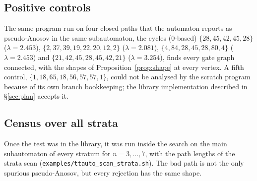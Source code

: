 \documentclass[12pt]{amsart}
\newcommand{\code}[1]{\texttt{#1}}
\newcommand{\lam}{\lambda}
\theoremstyle{plain}
\theoremstyle{definition}
\begin{document}
\subsection{Positive controls}
The same program run on four closed paths that the automaton reports as
pseudo-Anosov in the same subautomaton, the cycles (0-based)
$\{28,45,42,45,28\}$ ($\lam=2.453$), $\{2,37,39,19,22,20,12,2\}$
($\lam=2.081$), $\{4,84,28,45,28,80,4\}$ ($\lam=2.453$) and
$\{21,42,45,28,45,42,21\}$ ($\lam=3.254$), finds every gate graph
connected, with the shapes of Proposition~\ref{prop:shape} at every
vertex.  A fifth control, $\{1,18,65,18,56,57,57,1\}$, could not be
analysed by the scratch program because of its own branch bookkeeping; the
library implementation described in \S\ref{sec:plan} accepts it.

\subsection{Census over all strata}
\label{sec:census}
Once the test was in the library, it was run inside the search on the
main subautomaton of every stratum for $n=3,\dots,7$, with the path
lengths of the strata scan (\code{examples/ttauto\_scan\_strata.sh}).
The bad path is not the only spurious pseudo-Anosov, but every rejection
has the same shape.
\end{document}
